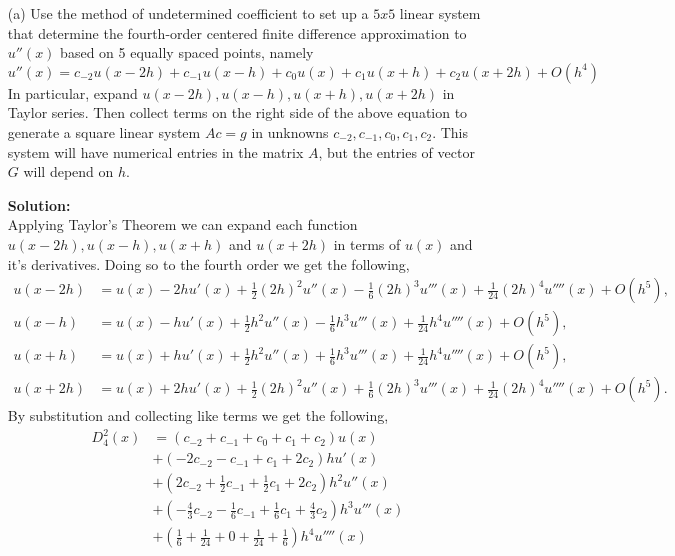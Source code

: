 \documentclass[12pt]{article}
\makeatletter
\theoremstyle{homework}
\newenvironment{exercise}[1]
{\def\@currentlabel{#1}\exercisecore}
{\endexercisecore}
\newcommand{\localhead}[1]{\par\smallskip\noindent\textbf{#1}\nobreak\\}%
\newcommand\solution{\localhead{Solution:}}
\makeatother
\begin{document}
\begin{exercise}{Problem P9}
  \begin{enumerate}
    \item[(a)] Use the method of undetermined coefficient to set up a $5 x 5$ linear system that 
    determine the fourth-order centered finite difference approximation to $u''(x)$ based on 5 equally 
    spaced points, namely
    \begin{equation*}
      u''(x) = c_{-2}u(x - 2h) + c_{-1}u(x - h) + c_0u(x) + c_{1}u(x + h) + c_{2}u(x + 2h) + O(h^4)
    \end{equation*}
    In particular, expand $u(x - 2h), u(x - h), u(x + h), u(x + 2h)$ in Taylor series. Then collect terms on the 
    right side of the above equation to generate a square linear system $Ac = g$ in unknowns $c_{-2},c_{-1}, c_{0}, c_{1}, c_{2}$.
    This system will have numerical entries in the matrix $A$, but the entries of vector $G$ will depend on $h$.
    \solution Applying Taylor's Theorem we can expand each function $u(x - 2h), u(x - h), u(x + h)$ and $u(x + 2h)$
    in terms of $u(x)$ and it's derivatives. Doing so to the fourth order we get the following, 
    \begin{align*}
      u(x - 2h) &= u(x) - 2hu'(x) + \frac{1}{2}(2h)^2u''(x) - \frac{1}{6}(2h)^3u'''(x) + \frac{1}{24}(2h)^4u''''(x) + O(h^5),\\
      u(x - h) &= u(x) - hu'(x) + \frac{1}{2}h^2u''(x) - \frac{1}{6}h^3u'''(x) + \frac{1}{24}h^4u''''(x) +  O(h^5),\\
      u(x + h) &= u(x) + hu'(x) + \frac{1}{2}h^2u''(x) + \frac{1}{6}h^3u'''(x) +  \frac{1}{24}h^4u''''(x) + O(h^5),\\
      u(x + 2h) &= u(x) + 2hu'(x) + \frac{1}{2}(2h)^2u''(x) + \frac{1}{6}(2h)^3u'''(x) + \frac{1}{24}(2h)^4u''''(x)+ O(h^5).
    \end{align*}
    By substitution and collecting like terms we get the following, 
    \begin{align*}
      D^2_4(x) &= (c_{-2} + c_{-1} + c_0 + c_1 + c_2)u(x)\\
              &+ (-2c_{-2} - c_{-1} + c_1 + 2c_2)hu'(x)\\
              &+ (2c_{-2} + \frac{1}{2}c_{-1} + \frac{1}{2}c_{1} + 2c_{2})h^2u''(x)\\
              &+ \left(-\frac{4}{3}c_{-2} - \frac{1}{6}c_{-1} + \frac{1}{6}c_1 + \frac{4}{3}c_{2}\right)h^3u'''(x)\\
              &+ \left(\frac{1}{6} + \frac{1}{24} + 0 + \frac{1}{24} + \frac{1}{6}\right)h^4u''''(x)\\

\end{align*}
\end{enumerate}
\end{exercise}
\end{document}

